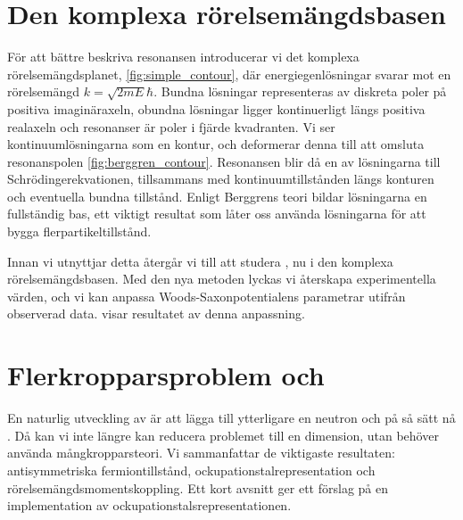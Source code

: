 \documentclass[12pt,a4paper]{article}
\begin{document}
\section{Den komplexa rörelsemängdsbasen}

För att bättre beskriva resonansen introducerar vi det komplexa rörelsemängdsplanet, \cref{fig:simple_contour}, där energiegenlösningar svarar mot en rörelsemängd $k = \sqrt{2mE}{\hbar}$.
Bundna lösningar representeras av diskreta poler på positiva imaginäraxeln, obundna lösningar ligger kontinuerligt längs positiva realaxeln och resonanser är poler i fjärde kvadranten.
Vi ser kontinuumlösningarna som en kontur, och deformerar denna till att omsluta resonanspolen \cref{fig:berggren_contour}. 
Resonansen blir då en av lösningarna till Schrödingerekvationen, tillsammans med kontinuumtillstånden längs konturen och eventuella bundna tillstånd.
Enligt Berggrens teori \cite{berggren} bildar lösningarna en fullständig bas, ett viktigt resultat som låter oss använda lösningarna för att bygga flerpartikeltillstånd.

Innan vi utnyttjar detta återgår vi till att studera , nu i den komplexa rörelsemängdsbasen. Med den nya metoden lyckas vi återskapa experimentella värden, och vi kan anpassa Woods-Saxonpotentialens parametrar utifrån observerad data.  visar resultatet av denna anpassning.

\section{Flerkropparsproblem och }
En naturlig utveckling av  är att lägga till ytterligare en neutron och på så sätt nå . 
Då kan vi inte längre kan reducera problemet till en dimension, utan behöver använda mångkropparsteori.
Vi sammanfattar de viktigaste resultaten: antisymmetriska fermiontillstånd, ockupationstalrepresentation och rörelsemängdsmomentskoppling.
Ett kort avsnitt ger ett förslag på en implementation av ockupationstalsrepresentationen.
\end{document}
